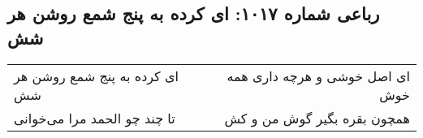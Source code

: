 \begin{center}
\section*{رباعی شماره ۱۰۱۷: ای کرده به پنج شمع روشن هر شش}
\label{sec:1017}
\begin{longtable}{l p{0.5cm} r}
ای کرده به پنج شمع روشن هر شش
&&
ای اصل خوشی و هرچه داری همه خوش
\\
تا چند چو الحمد مرا می‌خوانی
&&
همچون بقره بگیر گوش من و کش
\\
\end{longtable}
\end{center}
